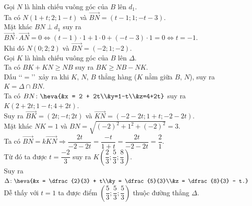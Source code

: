 \begin{ex}
{\begin{itemchoice}
Gọi $N$ là hình chiếu vuông góc của $B$ lên $d_1$.\\
Ta có $N \left(1 + t; 2; 1-t \right)$ và $\overrightarrow{BN} = \left(t-1; 1; -t-3 \right)$.\\
Mặt khác $BN \perp d_1$ suy ra $\overrightarrow{BN} \cdot \overrightarrow{AN} = 0 \Leftrightarrow\left(t - 1 \right) \cdot 1 + 1 \cdot 0 + \left(-t - 3 \right) \cdot 1 = 0 \Leftrightarrow t = -1$.\\
Khi đó $N \left(0;2;2 \right)$ và $\overrightarrow{BN} = \left(-2;1;-2 \right)$.\\
Gọi $K$ là hình chiếu vuông góc của $B$ lên $\Delta$. \\
Ta có $BK + KN \geq NB$ suy ra $BK \geq NB - NK$.\\
Dấu \lq\lq $=$\rq\rq \, xảy ra khi $K$, $N$, $B$ thẳng hàng ($K$ nằm giữa $B$, $N$), suy ra $K = \Delta \cap BN$.\\
Ta có $BN \colon \heva{&x = 2 + 2t\\&y=1-t\\&z=4+2t}$ suy ra $K\left(2+2t; 1-t; 4+2t \right)$.\\
Suy ra $\overrightarrow{BK} = \left(2t; -t; 2t\right)$ và $\overrightarrow{KN} = \left(-2-2t;1+t;-2-2t \right)$.\\
Mặt khác $NK = 1$ và $BN = \sqrt{(-2)^2 + 1^2 + (-2)^2} = 3$.\\
Ta có $\overrightarrow{BN} = k\overrightarrow{KN} \Rightarrow \dfrac{2t}{-2-2t} = \dfrac{-t}{1+t} = \dfrac{2t}{-2-2t} = \dfrac{2}{1}$.\\
Từ đó ta được $t = \dfrac{-2}{3}$ suy ra $K\left(\dfrac{2}{3}; \dfrac{5}{3}; \dfrac{8}{3} \right)$.\\
Suy ra $\Delta \colon \heva{&x = \dfrac{2}{3} + t\\&y = \dfrac{5}{3}\\&z = \dfrac{8}{3} - t.}$\\
Dễ thấy với $t = 1$ ta được điểm $\left(\dfrac{5}{3}; \dfrac{5}{3}; \dfrac{5}{3} \right)$ thuộc đường thẳng $\Delta$.
\end{itemchoice}
}
\end{ex}

